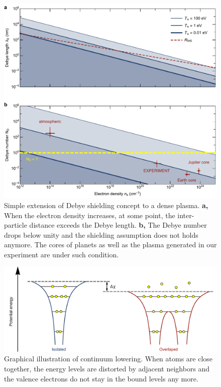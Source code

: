 \begin{figure}[ht!]
\centering
\includegraphics[width=130mm]{figures/ch3/Debye/number.pdf}
\caption{Simple extension of Debye shielding concept to a dense plasma. \textbf{a,} When the electron density increases, at some point, the inter-particle distance exceeds the Debye length. \textbf{b,} The Debye number drops below unity and the shielding assumption does not holds anymore. The cores of planets as well as the plasma generated in our experiment are under such condition.}
\label{fig:DebyeNumber}
\end{figure}

\begin{figure}[ht!]
\centering
\includegraphics[width=130mm]{figures/ch3/lowering/continuumLowering.pdf}
\caption{Graphical illustration of continuum lowering. When atoms are close together, the energy levels are distorted by adjacent neighbors and the valence electrons do not stay in the bound levels any more.}
\label{fig:continuumLowering}
\end{figure}

